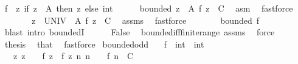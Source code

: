 \begin{isabellebody}
\ {\isacharquery}{\kern0pt}f\ {\isacharequal}{\kern0pt}\ {\isachardoublequoteopen}{\isasymlambda}z{\isachardot}{\kern0pt}\ {\isacharparenleft}{\kern0pt}if\ z\ {\isasymin}\ A\ then\ z\ else\ {\isacharparenleft}{\kern0pt}{}{\isacharcolon}{\kern0pt}{\isacharcolon}{\kern0pt}int{\isacharparenright}{\kern0pt}{\isacharparenright}{\kern0pt}{\isachardoublequoteclose}\isanewline
\ \ \ \ \isamarkupfalse%
\ bounded{\isacharcolon}{\kern0pt}\ {\isachardoublequoteopen}{\isasymforall}z\ {\isasymin}\ A{\isachardot}{\kern0pt}\ {\isasymbar}{\isacharquery}{\kern0pt}f\ z{\isasymbar}\ {\isasymle}\ C{\isachardoublequoteclose}\ \isamarkupfalse%
\ asm\ \isamarkupfalse%
\ fastforce\isanewline
\ \ \ \ \isamarkupfalse%
\ \isamarkupfalse%
\ {\isachardoublequoteopen}{\isasymforall}z\ {\isasymin}\ UNIV\ {\isacharminus}{\kern0pt}\ A{\isachardot}{\kern0pt}\ {\isasymbar}{\isacharquery}{\kern0pt}f\ z{\isasymbar}\ {\isasymle}\ C{\isachardoublequoteclose}\ \isamarkupfalse%
\ assms\ \isamarkupfalse%
\ fastforce\isanewline
\ \ \ \ \isamarkupfalse%
\ \isamarkupfalse%
\ {\isachardoublequoteopen}bounded\ {\isacharquery}{\kern0pt}f{\isachardoublequoteclose}\ \isamarkupfalse%
\ {\isacharparenleft}{\kern0pt}blast\ intro{\isacharcolon}{\kern0pt}\ boundedI{\isacharparenright}{\kern0pt}\isanewline
\ \ \ \ \isamarkupfalse%
\ False\ \isamarkupfalse%
\ bounded{\isacharunderscore}{\kern0pt}iff{\isacharunderscore}{\kern0pt}finite{\isacharunderscore}{\kern0pt}range\ assms\ \isamarkupfalse%
\ force\isanewline
\ \ \isacommand{{\isacharbraceright}{\kern0pt}}\isamarkupfalse%
\isanewline
\ \ \isamarkupfalse%
\ {\isacharquery}{\kern0pt}thesis\ \isamarkupfalse%
\ that\ \isamarkupfalse%
\ fastforce\isanewline
{}\isamarkupfalse%
%
\endisatagproof
{\isafoldproof}%
%
\isadelimproof
\isanewline
%
\endisadelimproof
\isanewline
{}\isamarkupfalse%
\ bounded{\isacharunderscore}{\kern0pt}odd{\isacharcolon}{\kern0pt}\isanewline
\ \ \ f\ {\isacharcolon}{\kern0pt}{\isacharcolon}{\kern0pt}\ {\isachardoublequoteopen}int\ {\isasymRightarrow}\ int{\isachardoublequoteclose}\isanewline
\ \ \ {\isachardoublequoteopen}{\isasymAnd}z{\isachardot}{\kern0pt}\ z\ {\isacharless}{\kern0pt}\ {}\ {\isasymLongrightarrow}\ f\ z\ {\isacharequal}{\kern0pt}\ {\isacharminus}{\kern0pt}f\ {\isacharparenleft}{\kern0pt}{\isacharminus}{\kern0pt}z{\isacharparenright}{\kern0pt}{\isachardoublequoteclose}\ {\isachardoublequoteopen}{\isasymAnd}n{\isachardot}{\kern0pt}\ n\ {\isachargreater}{\kern0pt}\ {}\ {\isasymLongrightarrow}\ {\isasymbar}f\ n{\isasymbar}\ {\isasymle}\ C{\isachardoublequoteclose}\isanewline

\end{isabellebody}
